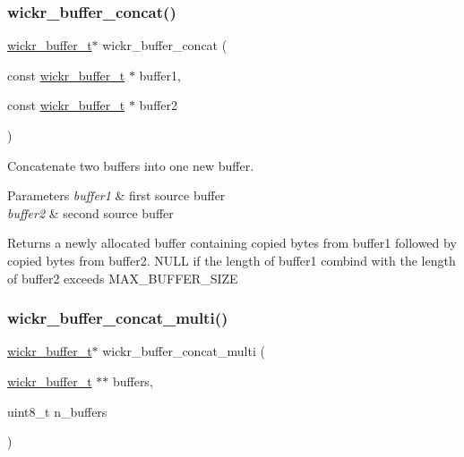 \subsubsection{\texorpdfstring{wickr\+\_\+buffer\+\_\+concat()}{wickr\_buffer\_concat()}}
{\footnotesize\ttfamily \hyperlink{structwickr__buffer}{wickr\+\_\+buffer\+\_\+t}$\ast$ wickr\+\_\+buffer\+\_\+concat (\begin{DoxyParamCaption}\item[{const \hyperlink{structwickr__buffer}{wickr\+\_\+buffer\+\_\+t} $\ast$}]{buffer1,  }\item[{const \hyperlink{structwickr__buffer}{wickr\+\_\+buffer\+\_\+t} $\ast$}]{buffer2 }\end{DoxyParamCaption})}



Concatenate two buffers into one new buffer. 


\begin{DoxyParams}{Parameters}
{\em buffer1} & first source buffer \\
\hline
{\em buffer2} & second source buffer \\
\hline
\end{DoxyParams}
\begin{DoxyReturn}{Returns}
a newly allocated buffer containing copied bytes from \textquotesingle{}buffer1\textquotesingle{} followed by copied bytes from \textquotesingle{}buffer2\textquotesingle{}. N\+U\+LL if the length of \textquotesingle{}buffer1\textquotesingle{} combind with the length of \textquotesingle{}buffer2\textquotesingle{} exceeds M\+A\+X\+\_\+\+B\+U\+F\+F\+E\+R\+\_\+\+S\+I\+ZE 
\end{DoxyReturn}
\mbox{\label{group__wickr__buffer_ga3aa7ea751a65310184d6c0ea9627dca8}} 
\subsubsection{\texorpdfstring{wickr\+\_\+buffer\+\_\+concat\+\_\+multi()}{wickr\_buffer\_concat\_multi()}}
{\footnotesize\ttfamily \hyperlink{structwickr__buffer}{wickr\+\_\+buffer\+\_\+t}$\ast$ wickr\+\_\+buffer\+\_\+concat\+\_\+multi (\begin{DoxyParamCaption}\item[{\hyperlink{structwickr__buffer}{wickr\+\_\+buffer\+\_\+t} $\ast$$\ast$}]{buffers,  }\item[{uint8\+\_\+t}]{n\+\_\+buffers }\end{DoxyParamCaption})}



